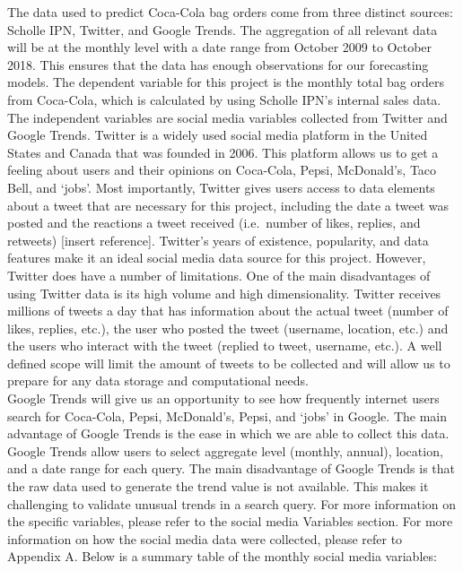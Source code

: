 \documentclass[12pt,oneside]{chicagocapstone}
\begin{document}
The data used to predict Coca-Cola bag orders come from three distinct sources: Scholle IPN, Twitter, and Google Trends. The aggregation of all relevant data will be at the monthly level with a date range from October 2009 to October 2018. This ensures that the data has enough observations for our forecasting models. The dependent variable for this project is the monthly total bag orders from Coca-Cola, which is calculated by using Scholle IPN's internal sales data. The independent variables are social media variables collected from Twitter and Google Trends.
Twitter is a widely used social media platform in the United States and Canada that was founded in 2006. This platform allows us to get a feeling about users and their opinions on Coca-Cola, Pepsi, McDonald's, Taco Bell, and `jobs'. Most importantly, Twitter gives users access to data elements about a tweet that are necessary for this project, including the date a tweet was posted and the reactions a tweet received (i.e.~number of likes, replies, and retweets) {[}insert reference{]}. Twitter's years of existence, popularity, and data features make it an ideal social media data source for this project. However, Twitter does have a number of limitations. One of the main disadvantages of using Twitter data is its high volume and high dimensionality. Twitter receives millions of tweets a day that has information about the actual tweet (number of likes, replies, etc.), the user who posted the tweet (username, location, etc.) and the users who interact with the tweet (replied to tweet, username, etc.). A well defined scope will limit the amount of tweets to be collected and will allow us to prepare for any data storage and computational needs.\\
Google Trends will give us an opportunity to see how frequently internet users search for Coca-Cola, Pepsi, McDonald's, Pepsi, and `jobs' in Google. The main advantage of Google Trends is the ease in which we are able to collect this data. Google Trends allow users to select aggregate level (monthly, annual), location, and a date range for each query. The main disadvantage of Google Trends is that the raw data used to generate the trend value is not available. This makes it challenging to validate unusual trends in a search query. For more information on the specific variables, please refer to the social media Variables section. For more information on how the social media data were collected, please refer to Appendix A. Below is a summary table of the monthly social media variables:
\end{document}
